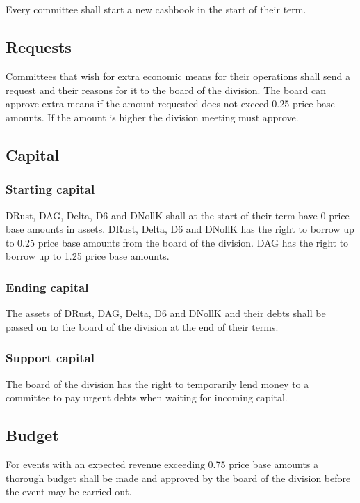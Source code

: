 \documentclass[a4paper]{dtek}
\begin{document}
\subsection{}
Every committee shall start a new cashbook in the start of their term. %

\subsection{Requests}
Committees that wish for extra economic means for their operations shall send a request and their reasons for it to the board of the division. The board can approve extra means if the amount requested does not exceed 0.25 price base amounts. If the amount is higher the division meeting must approve.

\subsection{Capital}
\label{sec:sektionsforeningar_startkapital}
\subsubsection{Starting capital}
DRust, DAG, Delta, D6 and DNollK shall at the start of their term have 0 price base amounts in assets. DRust, Delta, D6 and DNollK has the right to borrow up to 0.25 price base amounts from the board of the division. DAG has the right to borrow up to 1.25 price base amounts.

\subsubsection{Ending capital}
The assets of DRust, DAG, Delta, D6 and DNollK and their debts shall be passed on to the board of the division at the end of their terms.

\subsubsection{Support capital}
The board of the division has the right to temporarily lend money to a committee to pay urgent debts when waiting for incoming capital.

\subsection{Budget}
For events with an expected revenue exceeding 0.75 price base amounts a thorough budget shall be made and approved by the board of the division before the event may be carried out.
\end{document}
